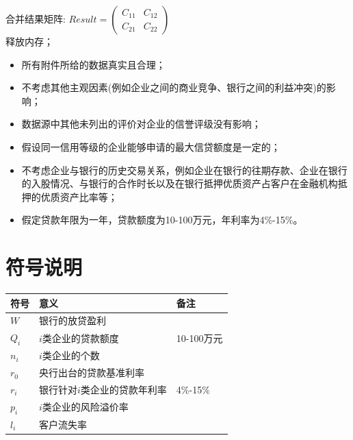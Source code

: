 \documentclass[withoutpreface,bwprint]{cumcmthesis} %
\begin{document}
\begin{algorithm}[ht]
{		合并结果矩阵:
		$Result=\left(\begin{array}{ll}C_{11} & C_{12} \\ C_{21} & C_{22}\end{array}\right)$\\
		释放内存；\\
		
	}
	

\end{algorithm}





\begin{itemize}
\item 所有附件所给的数据真实且合理；
\item 不考虑其他主观因素(例如企业之间的商业竞争、银行之间的利益冲突)的影响；
\item 数据源中其他未列出的评价对企业的信誉评级没有影响；
\item 假设同一信用等级的企业能够申请的最大信贷额度是一定的；
\item 不考虑企业与银行的历史交易关系，例如企业在银行的往期存款、企业在银行的入股情况、与银行的合作时长以及在银行抵押优质资产占客户在金融机构抵押的优质资产比率等；
\item 假定贷款年限为一年，贷款额度为10-100万元，年利率为4\%-15\%。
\end{itemize}


\section{符号说明}
\begin{center}
	\begin{tabular}{lll}
		\hline
		符号		  &  意义 & 备注\\ \hline
		$W$	    & 银行的放贷盈利 & \\ \hline
		$Q_i$	    & $i$类企业的贷款额度 & 10-100万元\\ \hline
		$n_i$		&$i$类企业的个数&\\ \hline
		$r_0$		&央行出台的贷款基准利率&\\ \hline
		$r_i$	    & 银行针对$i$类企业的贷款年利率& 4\%-15\% \\ \hline
		$p_i$		&$i$类企业的风险溢价率 &\\ \hline
		$l_i$		& 客户流失率 &\\ \hline

		
	
	\end{tabular}
\end{center}
\end{document}
